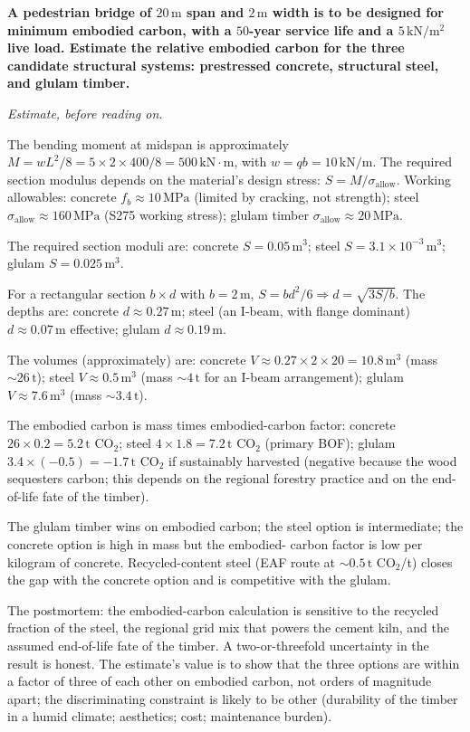 \begin{estimation}
\textbf{A pedestrian bridge of $20\,\text{m}$ span and $2\,\text{m}$
width is to be designed for minimum embodied carbon, with a $50$-year
service life and a $5\,\text{kN}/\text{m}^2$ live load. Estimate the
relative embodied carbon for the three candidate structural systems:
prestressed concrete, structural steel, and glulam timber.}

\smallskip
\textit{Estimate, before reading on.}

\smallskip
The bending moment at midspan is approximately $M = w L^2 / 8 = 5 \times
2 \times 400 / 8 = 500\,\text{kN}\cdot\text{m}$, with $w = q b = 10\,
\text{kN}/\text{m}$. The required section modulus depends on the
material's design stress: $S = M / \sigma_{\text{allow}}$. Working
allowables: concrete $f_b \approx 10\,\text{MPa}$ (limited by
cracking, not strength); steel $\sigma_{\text{allow}} \approx
160\,\text{MPa}$ (S275 working stress); glulam timber
$\sigma_{\text{allow}} \approx 20\,\text{MPa}$.

The required section moduli are: concrete $S = 0.05\,\text{m}^3$;
steel $S = 3.1 \times 10^{-3}\,\text{m}^3$; glulam $S = 0.025\,
\text{m}^3$.

For a rectangular section $b \times d$ with $b = 2\,\text{m}$, $S =
b d^2 / 6 \Rightarrow d = \sqrt{3 S / b}$. The depths are:
concrete $d \approx 0.27\,\text{m}$; steel (an I-beam, with
flange dominant) $d \approx 0.07\,\text{m}$ effective; glulam $d
\approx 0.19\,\text{m}$.

The volumes (approximately) are: concrete $V \approx 0.27 \times 2
\times 20 = 10.8\,\text{m}^3$ (mass $\sim 26\,\text{t}$); steel
$V \approx 0.5\,\text{m}^3$ (mass $\sim 4\,\text{t}$ for an I-beam
arrangement); glulam $V \approx 7.6\,\text{m}^3$ (mass $\sim
3.4\,\text{t}$).

The embodied carbon is mass times embodied-carbon factor: concrete
$26 \times 0.2 = 5.2\,\text{t CO}_2$; steel $4 \times 1.8 = 7.2\,
\text{t CO}_2$ (primary BOF); glulam $3.4 \times (-0.5) = -1.7\,
\text{t CO}_2$ if sustainably harvested (negative because the wood
sequesters carbon; this depends on the regional forestry practice and
on the end-of-life fate of the timber).

The glulam timber wins on embodied carbon; the steel option is
intermediate; the concrete option is high in mass but the embodied-
carbon factor is low per kilogram of concrete. Recycled-content
steel (EAF route at $\sim 0.5\,\text{t CO}_2$/t) closes the gap with
the concrete option and is competitive with the glulam.

The postmortem: the embodied-carbon calculation is sensitive to the
recycled fraction of the steel, the regional grid mix that powers the
cement kiln, and the assumed end-of-life fate of the timber. A
two-or-threefold uncertainty in the result is honest. The estimate's
value is to show that the three options are within a factor of three
of each other on embodied carbon, not orders of magnitude apart; the
discriminating constraint is likely to be other (durability of the
timber in a humid climate; aesthetics; cost; maintenance burden).
\end{estimation}

